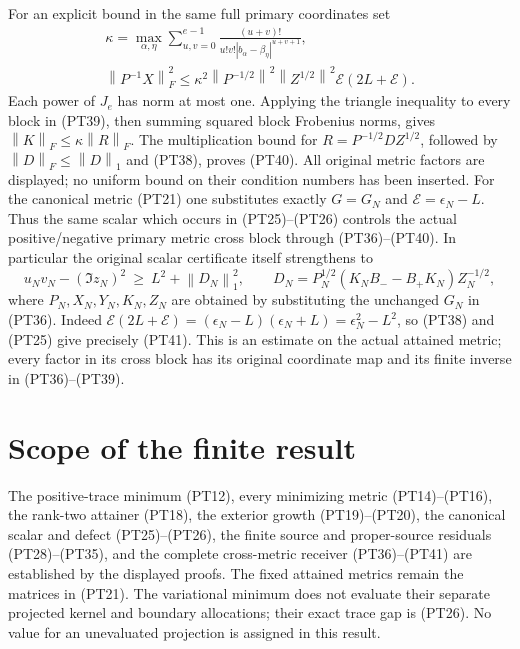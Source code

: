 \documentclass[11pt]{article}
\newcommand{\norm}[1]{\left\lVert#1\right\rVert}
\begin{document}
For an explicit bound in the same full primary coordinates set
\begin{equation}\tag{PT40}
 \begin{gathered}
 \kappa=\max_{\alpha,\eta}
       \sum_{u,v=0}^{e-1}
       \frac{(u+v)!}{u!v!|b_\alpha-\beta_\eta|^{u+v+1}},\\
 \norm{P^{-1}X}_F^2
 \le\kappa^2\norm{P^{-1/2}}^2\norm{Z^{1/2}}^2
                  \mathcal E(2L+\mathcal E).
 \end{gathered}
\end{equation}
Each power of \(J_e\) has norm at most one. Applying the triangle
inequality to every block in (PT39), then summing squared block
Frobenius norms, gives \(\norm K_F\le\kappa\norm R_F\).
The multiplication bound for \(R=P^{-1/2}DZ^{1/2}\), followed
by \(\norm D_F\le\norm D_1\) and (PT38), proves (PT40).
All original metric factors are displayed; no uniform bound on
their condition numbers has been inserted.
For the canonical metric (PT21) one substitutes exactly
\(G=G_N\) and \(\mathcal E=\epsilon_N-L\). Thus the same
scalar which occurs in (PT25)--(PT26) controls the actual
positive/negative primary metric cross block through (PT36)--(PT40).
In particular the original scalar certificate itself strengthens to
\begin{equation}\tag{PT41}
 u_Nv_N-(\Im z_N)^2\ \ge\ L^2+\norm{D_N}_1^2,
 \qquad
 D_N=P_N^{1/2}(K_NB_--B_+K_N)Z_N^{-1/2},
\end{equation}
where \(P_N,X_N,Y_N,K_N,Z_N\) are obtained by substituting
the unchanged \(G_N\) in (PT36). Indeed
\(\mathcal E(2L+\mathcal E)=(\epsilon_N-L)
(\epsilon_N+L)=\epsilon_N^2-L^2\), so (PT38) and (PT25)
give precisely (PT41). This is an estimate on the actual attained
metric; every factor in its cross block has its original coordinate
map and its finite inverse in (PT36)--(PT39).

\section{Scope of the finite result}

The positive-trace minimum (PT12), every minimizing metric
(PT14)--(PT16), the rank-two attainer (PT18), the exterior growth
(PT19)--(PT20), the canonical scalar and defect (PT25)--(PT26),
the finite source and proper-source residuals (PT28)--(PT35),
and the complete cross-metric receiver (PT36)--(PT41)
are established by the displayed proofs. The fixed attained
metrics remain the matrices in (PT21). The variational minimum
does not evaluate their separate projected kernel and boundary
allocations; their exact trace gap is (PT26). No value for an
unevaluated projection is assigned in this result.
\end{document}
